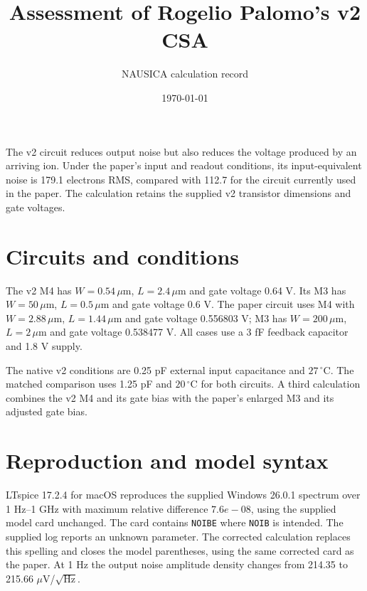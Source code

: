 \documentclass[11pt,a4paper]{article}
\title{Assessment of Rogelio Palomo's v2 CSA}
\author{NAUSICA calculation record}\date{\today}
\begin{document}
\maketitle
The v2 circuit reduces output noise but also reduces the voltage produced by
an arriving ion. Under the paper's input and readout conditions, its
input-equivalent noise is 179.1 electrons RMS, compared with 112.7 for
the circuit currently used in the paper. The calculation retains the supplied
v2 transistor dimensions and gate voltages.

\section*{Circuits and conditions}
The v2 M4 has $W=0.54\,\mu$m, $L=2.4\,\mu$m and gate voltage 0.64 V.
Its M3 has $W=50\,\mu$m, $L=0.5\,\mu$m and gate voltage 0.6 V.
The paper circuit uses M4 with $W=2.88\,\mu$m, $L=1.44\,\mu$m and
gate voltage 0.556803 V; M3 has $W=200\,\mu$m, $L=2\,\mu$m and gate
voltage 0.538477 V. All cases use a 3 fF feedback capacitor and 1.8 V supply.

The native v2 conditions are 0.25 pF external input capacitance and
$27\,^{\circ}$C. The matched comparison uses 1.25 pF and $20\,^{\circ}$C
for both circuits. A third calculation combines the v2 M4 and its gate bias
with the paper's enlarged M3 and its adjusted gate bias.

\section*{Reproduction and model syntax}
LTspice 17.2.4 for macOS reproduces the supplied Windows 26.0.1 spectrum
over 1 Hz--1 GHz with maximum relative difference $7.6e-08$, using the
supplied model card unchanged. The card contains \texttt{NOIBE} where
\texttt{NOIB} is intended. The supplied log reports an unknown parameter.
The corrected calculation replaces this spelling and closes the model
parentheses, using the same corrected card as the paper. At 1 Hz the output
noise amplitude density changes from 214.35 to 215.66
$\mu$V/$\sqrt{\mathrm{Hz}}$.
\end{document}
